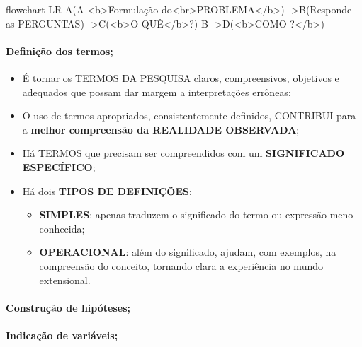 \documentclass[
]{book}
\newenvironment{Shaded}{\begin{snugshade}}{\end{snugshade}}
\newcommand{\NormalTok}[1]{#1}
\providecommand{\tightlist}{%
  \setlength{\itemsep}{0pt}\setlength{\parskip}{0pt}}
\begin{document}
\begin{Shaded}
\begin{Highlighting}[]
\NormalTok{flowchart LR}
\NormalTok{A(A \textless{}b\textgreater{}Formulação do\textless{}br\textgreater{}PROBLEMA\textless{}/b\textgreater{}){-}{-}\textgreater{}B(Responde as PERGUNTAS){-}{-}\textgreater{}C(\textless{}b\textgreater{}O QUÊ\textless{}/b\textgreater{}?)}
\NormalTok{B{-}{-}\textgreater{}D(\textless{}b\textgreater{}COMO ?\textless{}/b\textgreater{})}
\end{Highlighting}
\end{Shaded}

\hypertarget{definiuxe7uxe3o-dos-termos}{%
\paragraph{Definição dos termos;}\label{definiuxe7uxe3o-dos-termos}}

\begin{itemize}
\tightlist
\item
  É tornar os TERMOS DA PESQUISA claros, compreensivos, objetivos e adequados que possam dar margem a interpretações errôneas;
\item
  O uso de termos apropriados, consistentemente definidos, CONTRIBUI para a \textbf{melhor compreensão da REALIDADE OBSERVADA};
\item
  Há TERMOS que precisam ser compreendidos com um \textbf{SIGNIFICADO ESPECÍFICO};
\item
  Há dois \textbf{TIPOS DE DEFINIÇÕES}:

  \begin{itemize}
  \tightlist
  \item
    \textbf{SIMPLES}: apenas traduzem o significado do termo ou expressão meno
    conhecida;
  \item
    \textbf{OPERACIONAL}: além do significado, ajudam, com exemplos, na
    compreensão do conceito, tornando clara a experiência no mundo
    extensional.
  \end{itemize}
\end{itemize}

\hypertarget{construuxe7uxe3o-de-hipuxf3teses}{%
\paragraph{Construção de hipóteses;}\label{construuxe7uxe3o-de-hipuxf3teses}}

\hypertarget{indicauxe7uxe3o-de-variuxe1veis}{%
\paragraph{Indicação de variáveis;}\label{indicauxe7uxe3o-de-variuxe1veis}}
\end{document}
